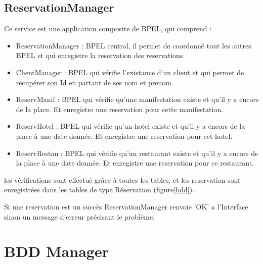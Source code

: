 	\subsection{ReservationManager}

		Ce service est une application composite de BPEL, qui comprend :
		\begin{itemize}
		  \item ReservationManager : BPEL central, il permet de coordonné tout les
		  autres BPEL et qui enregistre la reservation des reservations.
		  \item ClientManager : BPEL qui vérifie l'existance d'un client et qui
		  permet de récupérer son Id en partant de ses nom et prenom.
		  \item ReservManif : BPEL qui vérifie qu'une manifestation existe et qu'il y
		  a encors de la place. Et enregistre une reservation pour cette
		  manifestation.
		  \item ReservHotel : BPEL qui vérifie qu'un hotel existe et qu'il y a encors
		  de la place à une date donnée. Et enregistre une reservation pour cet
		  hotel.
		  \item ReservRestau : BPEL qui vérifie qu'un restaurant existe et qu'il y a
		  encors de la place à une date donnée. Et enregistre une reservation pour ce
		  restaurant.
		\end{itemize}
		
		les vérifications sont effectué grâce à toutes les tables, et les reservation
		sont enregistrées dans les tables de type Réservation (figure\ref{bdd}).
		
		Si une reservation est un succès ReservationManager renvoie 'OK' a l'Interface
		sinon un message d'erreur précisant le problème.

\section{BDD Manager}

\clearpage




















